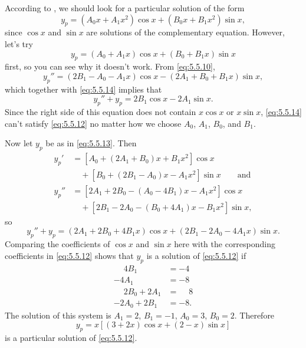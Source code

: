 \begin{solution}
According to  , we should look for a
particular solution of the form
\begin{equation} \label{eq:5.5.13}
y_p=(A_0x+A_1x^2)\cos x+(B_0x+B_1x^2)\sin x,
\end{equation}
since $\cos x$ and $\sin x$ are solutions of the complementary
equation. However, let's  try
\begin{equation} \label{eq:5.5.14}
y_p=(A_0+A_1x)\cos x+(B_0+B_1x)\sin x
\end{equation}
first, so you can see why it doesn't work. From \eqref{eq:5.5.10},
\[
 y_p''=(2B_1-A_0-A_1x)\cos x-(2A_1+B_0+B_1x)\sin x,
\]
which together with \eqref{eq:5.5.14} implies that
\[
y_p''+y_p=2B_1\cos x-2A_1\sin x.
\]
Since the right side of this equation does not contain $x\cos x$
or $x\sin x$,  \eqref{eq:5.5.14} can't satisfy
\eqref{eq:5.5.12} no matter how we choose $A_0$, $A_1$, $B_0$, and $B_1$.

Now let $y_p$ be as in \eqref{eq:5.5.13}. Then
\begin{align*}
y_p'
&=\left[A_0+(2A_1+B_0)x+B_1x^2\right]\cos x\\
&\quad{}+\left[B_0+(2B_1-A_0)x-A_1x^2\right]\sin x\qquad \text{and}\\
y_p''
&=\left[2A_1+2B_0-(A_0-4B_1)x-A_1x^2\right]\cos x\\
&\quad{}+\left[2B_1-2A_0-(B_0+4A_1)x-B_1x^2\right]\sin x,
\end{align*}
so
\[
y_p''+y_p=(2A_1+2B_0+4B_1x)\cos x+(2B_1-2A_0-4A_1x)\sin x.
\]
Comparing the  coefficients of $\cos x$ and
$\sin x$ here  with the corresponding coefficients  in \eqref{eq:5.5.12}
shows that
$y_p$ is a solution of \eqref{eq:5.5.12} if
\begin{align*}
\phantom{-}4B_1&=-4\\
-4A_1&=-8\\
\phantom{-}2B_0+2A_1&=\phantom{-}8\\
-2A_0+2B_1&=-8.
\end{align*}
The solution of this system is  $A_1=2$, $B_1=-1$, $A_0=3$, $B_0=2$.
  Therefore
\[
y_p=x\left[(3+2x)\cos x+(2-x)\sin x\right]
\]
is a particular solution of \eqref{eq:5.5.12}.
\end{solution}



